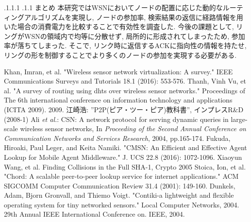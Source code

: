 \documentclass[a4paper, twocolumn]{jarticle}
\makeatletter
\def\section{\@startsection{section}{1}{\z@}%
 {.1\Cvs \@plus.1\Cdp \@minus.1\Cdp}%
 {.1\Cvs \@plus.1\Cdp}%
 {\normalfont\normalsize\bfseries}}
\makeatother
\begin{document}
\section{まとめ}
本研究ではWSNにおいてノードの配置に応じた動的なルーティングアルゴリズムを実現し,
ノードの参加率, 検索結果の返信に経路情報を用いた場合の消費電力を比較することで有効性を調査した.
今後の課題として, リングがWSNの領域内で均等に分散せず, 局所的に形成されてしまったため, 参加率が落ちてしまった.
そこで, リンク時に返信するACKに指向性の情報を持たせ, リングの形を制御することでより多くのノードの参加を実現する必要がある. 
\begin{thebibliography}{9}
{\small
{}
Khan, Imran, et al. "Wireless sensor network virtualization: A survey." IEEE Communications Surveys and Tutorials 18.1 (2016): 553-576.
Thanh, Vinh Vu, et al. "A survey of routing using dhts over wireless sensor networks." Proceedings of The 6th international conference on information technology and applications (ICITA 2009). 2009.
江崎浩: ''P2P(ピア・ツー・ピア)教科書'', インプレスR\&D (2008-1)
Ali {\em et al.}: CSN: A network protocol for serving dynamic queries in large-scale wireless sensor networks, In {\em Proceeding of the Second Annual Conference on Communication Networks and Services Research}, 2004, pp.165-174.
Fukuda, Hiroaki, Paul Leger, and Keita Namiki. "CMSN: An Efficient and Effective Agent Lookup for Mobile Agent Middleware." J. UCS 22.8 (2016): 1072-1096.
Xiaoyun Wang, et al. Finding Collisions in the Full SHA-1, Crypto 2005
Stoica, Ion, et al. "Chord: A scalable peer-to-peer lookup service for internet applications." ACM SIGCOMM Computer Communication Review 31.4 (2001): 149-160.
Dunkels, Adam, Bjorn Gronvall, and Thiemo Voigt. "Contiki-a lightweight and flexible operating system for tiny networked sensors." Local Computer Networks, 2004. 29th Annual IEEE International Conference on. IEEE, 2004.
}
\end{thebibliography}
\end{document}
